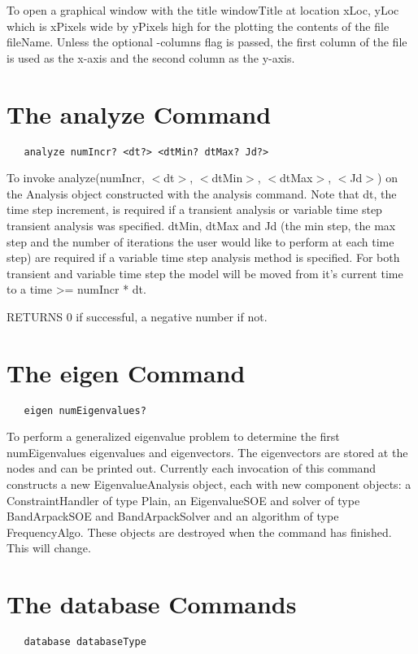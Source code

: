 \documentclass[12pt]{article}
\begin{document}
\noindent To open a graphical window with the title windowTitle at location
xLoc, yLoc which is xPixels wide by yPixels high for the plotting the
contents of the file fileName. Unless the optional -columns flag is
passed, the first column of the file is used as the x-axis and the
second column as the y-axis. 

\section {The analyze Command}
{\sf\small
\begin{verbatim}
   analyze numIncr? <dt?> <dtMin? dtMax? Jd?>
\end{verbatim}
}

\noindent To invoke analyze(numIncr, $<$dt$>$, $<$dtMin$>$,
$<$dtMax$>$, $<$Jd$>$) on the Analysis object constructed with the
analysis command. Note that dt, the time step increment, is required
if a transient analysis or variable time step transient analysis was
specified. dtMin, dtMax and Jd (the min step, the max step and the
number of iterations the user would like to perform at each time step)
are required if a variable time step analysis method is specified.
For both transient and variable time step the model will be moved from
it's current time to a time >= numIncr * dt.

RETURNS $0$ if successful, a negative number if not.



\section {The eigen Command}
{\sf\small
\begin{verbatim}
   eigen numEigenvalues?
\end{verbatim}
}

\noindent To perform a generalized eigenvalue problem to determine the
first numEigenvalues eigenvalues and eigenvectors. The eigenvectors
are stored at the nodes and can be printed out. Currently each
invocation of this command constructs a new EigenvalueAnalysis object,
each with new component objects: a ConstraintHandler of type Plain, an
EigenvalueSOE and solver of type BandArpackSOE and BandArpackSolver
and an algorithm of type FrequencyAlgo. These objects are destroyed
when the command has finished. This will change.

\section {The database Commands}
{\sf\small
\begin{verbatim}
   database databaseType 
\end{verbatim}
}
\end{document}
